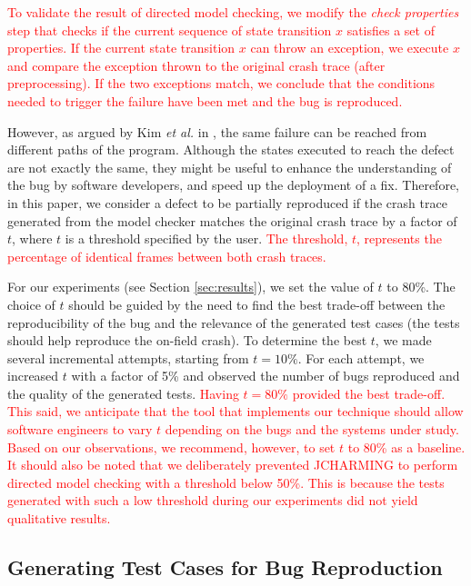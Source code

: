 \documentclass[times, doublespace]{smrauth}
\newcommand{\red}[1]{\textcolor{red}{#1}}
\begin{document}
{\red{To validate the result of directed model checking, we modify
the {\it check properties} step that checks if the current sequence
of state transition $x$ satisfies a set of properties. If the current
state transition $x$ can throw an exception, we execute $x$ and
compare the exception thrown to the original crash trace (after
preprocessing). If the two exceptions match, we conclude that
the conditions needed to trigger the failure have been met and
the bug is reproduced.}

However, as argued by Kim {\it et al.} in \cite{Kim2013b}, the same failure can
be reached from different paths of the program. Although the
states executed to reach the defect are not exactly the same,
they might be useful to enhance the understanding of the bug
by software developers, and speed up the deployment of a fix.
Therefore, in this paper, we consider a defect to be partially
reproduced if the crash trace generated from the model
checker matches the original crash trace by a factor of $t$, where
$t$ is a threshold specified by the user. \red{The threshold, $t$, represents the percentage of
identical frames between both crash traces.}

For our experiments (see Section \ref{sec:results}), we set the value of $t$ to 80\%.
The choice of $t$ should be guided by the need to find the best trade-off
between the reproducibility of the bug and
the relevance  of the generated test cases (the tests should help
 reproduce the on-field crash). To determine the best $t$, we made several incremental attempts, starting  from $t = 10\%$.  For each attempt, we increased $t$ with a factor of 5\% and
observed the number of bugs reproduced and the quality of the generated tests.
\red{Having $t = 80\%$ provided the best trade-off. This said, we anticipate that the tool that implements
our technique should allow software engineers to vary $t$ depending on the bugs and the systems under study. Based on our observations, we recommend, however,
to set $t$ to 80\% as a baseline. It should also be noted that we deliberately prevented JCHARMING to perform directed model checking with a threshold below 50\%. This is because the tests generated with such a low threshold during our experiments did not yield qualitative results.}


\subsection{Generating Test Cases for Bug Reproduction\label{sec:unit-tests}}

}
\end{document}
